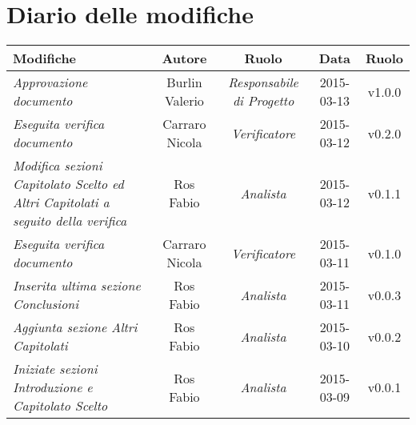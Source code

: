 \newpage
\section*{Diario delle modifiche}

\begin{table}[h]
\centering
\begin{tabular}{|p{}|c|c|c|c|}
	\toprule
		\textbf{Modifiche} & \textbf{Autore} & \textbf{Ruolo} & \textbf{Data} & \textbf{Ruolo} \\
	\midrule
	\midrule
		\textit{Approvazione documento} & Burlin Valerio & \textit{Responsabile di Progetto} & 2015-03-13 & v1.0.0 \\
	\midrule
		\textit{Eseguita verifica documento} & Carraro Nicola & \textit{Verificatore} & 2015-03-12 & v0.2.0 \\
	\midrule
		\textit{Modifica sezioni Capitolato Scelto ed Altri Capitolati a seguito della verifica} & Ros Fabio & \textit{Analista} & 2015-03-12 & v0.1.1 \\
	\midrule
		\textit{Eseguita verifica documento} & Carraro Nicola & \textit{Verificatore} & 2015-03-11 & v0.1.0 \\
	\midrule
		\textit{Inserita ultima sezione Conclusioni} & Ros Fabio & \textit{Analista} & 2015-03-11 & v0.0.3 \\
	\midrule
		\textit{Aggiunta sezione Altri Capitolati} & Ros Fabio & \textit{Analista} & 2015-03-10 & v0.0.2 \\
	\midrule
		\textit{Iniziate sezioni Introduzione e Capitolato Scelto} & Ros Fabio & \textit{Analista} & 2015-03-09 & v0.0.1 \\
	\bottomrule
\end{tabular}
\end{table}

\newpage
